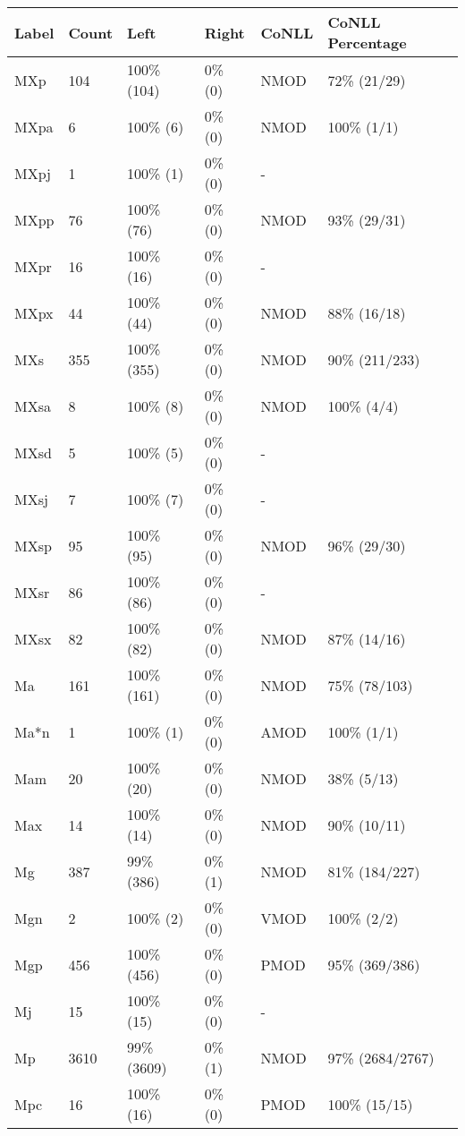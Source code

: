 \begin{figure*}
\begin{tabular}{|l|l|l|l||l|l|}
\hline
Label & Count & Left & Right & CoNLL & CoNLL Percentage\\ 
\hline
 MXp & 104 & 100\% (104) & 0\% (0) & NMOD & 72\% (21/29) \\ 
\hline
 MXpa & 6 & 100\% (6) & 0\% (0) & NMOD & 100\% (1/1) \\ 
\hline
 MXpj & 1 & 100\% (1) & 0\% (0) & - &  \\ 
\hline
 MXpp & 76 & 100\% (76) & 0\% (0) & NMOD & 93\% (29/31) \\ 
\hline
 MXpr & 16 & 100\% (16) & 0\% (0) & - &  \\ 
\hline
 MXpx & 44 & 100\% (44) & 0\% (0) & NMOD & 88\% (16/18) \\ 
\hline
 MXs & 355 & 100\% (355) & 0\% (0) & NMOD & 90\% (211/233) \\ 
\hline
 MXsa & 8 & 100\% (8) & 0\% (0) & NMOD & 100\% (4/4) \\ 
\hline
 MXsd & 5 & 100\% (5) & 0\% (0) & - &  \\ 
\hline
 MXsj & 7 & 100\% (7) & 0\% (0) & - &  \\ 
\hline
 MXsp & 95 & 100\% (95) & 0\% (0) & NMOD & 96\% (29/30) \\ 
\hline
 MXsr & 86 & 100\% (86) & 0\% (0) & - &  \\ 
\hline
 MXsx & 82 & 100\% (82) & 0\% (0) & NMOD & 87\% (14/16) \\ 
\hline
 Ma & 161 & 100\% (161) & 0\% (0) & NMOD & 75\% (78/103) \\ 
\hline
 Ma*n & 1 & 100\% (1) & 0\% (0) & AMOD & 100\% (1/1) \\ 
\hline
 Mam & 20 & 100\% (20) & 0\% (0) & NMOD & 38\% (5/13) \\ 
\hline
 Max & 14 & 100\% (14) & 0\% (0) & NMOD & 90\% (10/11) \\ 
\hline
 Mg & 387 & 99\% (386) & 0\% (1) & NMOD & 81\% (184/227) \\ 
\hline
 Mgn & 2 & 100\% (2) & 0\% (0) & VMOD & 100\% (2/2) \\ 
\hline
 Mgp & 456 & 100\% (456) & 0\% (0) & PMOD & 95\% (369/386) \\ 
\hline
 Mj & 15 & 100\% (15) & 0\% (0) & - &  \\ 
\hline
 Mp & 3610 & 99\% (3609) & 0\% (1) & NMOD & 97\% (2684/2767) \\ 
\hline
 Mpc & 16 & 100\% (16) & 0\% (0) & PMOD & 100\% (15/15) \\ 
\hline

\end{tabular}
\end{figure*}
